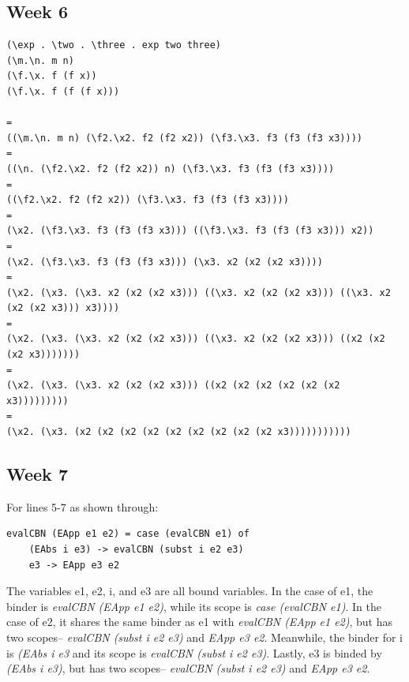 \documentclass{article}
\theoremstyle{theorem}
\theoremstyle{definition}
\theoremstyle{remark}
\begin{document}
\subsection{Week 6}
\begin{lstlisting}
(\exp . \two . \three . exp two three)
(\m.\n. m n)
(\f.\x. f (f x))
(\f.\x. f (f (f x)))

=
((\m.\n. m n) (\f2.\x2. f2 (f2 x2)) (\f3.\x3. f3 (f3 (f3 x3))))
=
((\n. (\f2.\x2. f2 (f2 x2)) n) (\f3.\x3. f3 (f3 (f3 x3))))
=
((\f2.\x2. f2 (f2 x2)) (\f3.\x3. f3 (f3 (f3 x3))))
=
(\x2. (\f3.\x3. f3 (f3 (f3 x3))) ((\f3.\x3. f3 (f3 (f3 x3))) x2))
=
(\x2. (\f3.\x3. f3 (f3 (f3 x3))) (\x3. x2 (x2 (x2 x3))))
=
(\x2. (\x3. (\x3. x2 (x2 (x2 x3))) ((\x3. x2 (x2 (x2 x3))) ((\x3. x2 (x2 (x2 x3))) x3))))
=
(\x2. (\x3. (\x3. x2 (x2 (x2 x3))) ((\x3. x2 (x2 (x2 x3))) ((x2 (x2 (x2 x3)))))))
=
(\x2. (\x3. (\x3. x2 (x2 (x2 x3))) ((x2 (x2 (x2 (x2 (x2 (x2 x3)))))))))
=
(\x2. (\x3. (x2 (x2 (x2 (x2 (x2 (x2 (x2 (x2 (x2 x3)))))))))))
\end{lstlisting}
\subsection{Week 7}

For lines 5-7 as shown through:
\begin{lstlisting}
evalCBN (EApp e1 e2) = case (evalCBN e1) of
    (EAbs i e3) -> evalCBN (subst i e2 e3)
    e3 -> EApp e3 e2
\end{lstlisting}
The variables e1, e2, i, and e3 are all bound variables. In the case of e1, the binder is \textit{evalCBN (EApp e1 e2)}, while its scope is \textit{case (evalCBN e1)}. In the case of e2, it shares the same binder as e1 with \textit{evalCBN (EApp e1 e2)}, but has two scopes-- \textit{evalCBN (subst i e2 e3)} and \textit{EApp e3 e2}. Meanwhile, the binder for i is \textit{(EAbs i e3} and its scope is \textit{evalCBN (subst i e2 e3)}. Lastly, e3 is binded by \textit{(EAbs i e3)}, but has two scopes-- \textit{evalCBN (subst i e2 e3)} and \textit{EApp e3 e2}.
\end{document}
